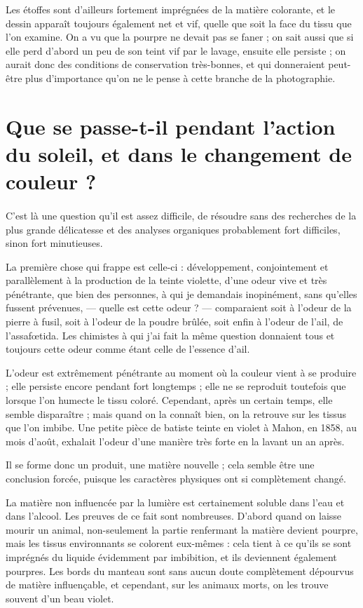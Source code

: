 \documentclass[a4paper, 11pt, oneside, polutonikogreek, french]{article}
\begin{document}
Les étoffes sont d'ailleurs fortement imprégnées de la matière colorante, et le dessin apparaît toujours également net et vif, quelle que soit la face du tissu que l'on examine. On a vu que la pourpre ne devait pas se faner ; on sait aussi que si elle perd d'abord un peu de son teint vif par le lavage, ensuite elle persiste ; on aurait donc des conditions de conservation très-bonnes, et qui donneraient peut-être plus d'importance qu'on ne le pense à cette branche de la photographie.
\clearpage
\section{Que se passe-t-il pendant l'action du soleil, et dans le changement de couleur ?}
\paragraph{}
C'est là une question qu'il est assez difficile, de résoudre sans des recherches de la plus grande délicatesse et des analyses organiques probablement fort difficiles, sinon fort minutieuses.

La première chose qui frappe est celle-ci : développement, conjointement et parallèlement à la production de la teinte violette, d'une odeur vive et très pénétrante, que bien des personnes, à qui je demandais inopinément, sans qu'elles fussent prévenues, --- quelle est cette odeur ? --- comparaient soit à l'odeur de la pierre à fusil, soit à l'odeur de la poudre brûlée, soit enfin à l'odeur de l'ail, de l'assafœtida. Les chimistes à qui j'ai fait la même question donnaient tous et toujours cette odeur comme étant celle de l'essence d'ail.

L'odeur est extrêmement pénétrante au moment où la couleur vient à se produire ; elle persiste encore pendant fort longtemps ; elle ne se reproduit toutefois que lorsque l'on humecte le tissu coloré. Cependant, après un certain temps, elle semble disparaître ; mais quand on la connaît bien, on la retrouve sur les tissus que l'on imbibe. Une petite pièce de batiste teinte en violet à Mahon, en 1858, au mois d'août, exhalait l'odeur d'une manière très forte en la lavant un an après.

Il se forme donc un produit, une matière nouvelle ; cela semble être une conclusion forcée, puisque les caractères physiques ont si complètement changé.

La matière non influencée par la lumière est certainement soluble dans l'eau et dans l'alcool. Les preuves de ce fait sont nombreuses. D'abord quand on laisse mourir un animal, non-seulement la partie renfermant la matière devient pourpre, mais les tissus environnants se colorent eux-mêmes : cela tient à ce qu'ils se sont imprégnés du liquide évidemment par imbibition, et ils deviennent également pourpres. Les bords du manteau sont sans aucun doute complètement dépourvus de matière influençable, et cependant, sur les animaux morts, on les trouve souvent d'un beau violet.
\end{document}
